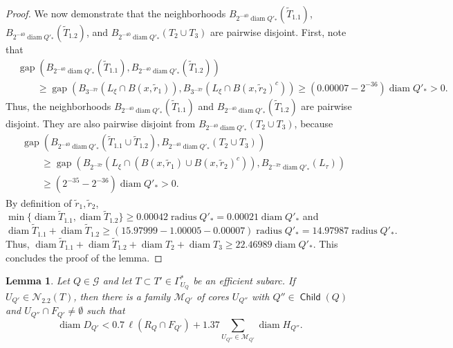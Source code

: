 \documentclass[12pt]{amsart}
\numberwithin{equation}{section}
\theoremstyle{plain}
\newtheorem{lemma}[theorem]{Lemma}
\theoremstyle{definition}
\newcommand{\radius}{\mathop\mathrm{radius}\nolimits}
\newcommand{\diam}{\mathop\mathrm{diam}\nolimits}
\newcommand{\Child}{\mathop\mathsf{Child}\nolimits}
\newcommand{\gap}{\mathop\mathrm{gap}\nolimits}
\numberwithin{figure}{section}
\begin{document}
\begin{proof}
We now demonstrate that the neighborhoods $B_{2^{-40}\diam Q'_*}(\tilde T_{1.1})$, $B_{2^{-40}\diam Q'_*}(\tilde T_{1.2})$, and $B_{2^{-40}\diam Q'_*}(T_2 \cup T_3)$ are pairwise disjoint.  First, note that
\begin{align*}
    &\gap(B_{2^{-40}\diam Q'_*}(\tilde T_{1.1}), B_{2^{-40}\diam Q'_*}(\tilde T_{1.2}))\\
    &\qquad \geq \gap(B_{3^{-37}}(L_{\xi} \cap B(x,\tilde r_1)), B_{3^{-37}}(L_{\xi} \cap B(x,\tilde r_2)^c)) \geq (0.00007 - 2^{-36})\diam Q'_*>0.
\end{align*}
Thus, the neighborhoods $B_{2^{-40}\diam Q'_*}(\tilde T_{1.1})$ and $B_{2^{-40}\diam Q'_*}(\tilde T_{1.2})$ are pairwise disjoint. They are also pairwise disjoint from $B_{2^{-40}\diam Q'_*}(T_2 \cup T_3)$, because 
\begin{align*}
    &\gap(B_{2^{-40}\diam Q'_*}(\tilde T_{1.1} \cup \tilde T_{1.2}), B_{2^{-40}\diam Q'_*}(T_2 \cup T_3))\\
    &\qquad \geq \gap\left(B_{2^{-37}}\left(L_{\xi} \cap \left(B(x,\tilde r_1) \cup B(x,\tilde r_2)^c \right)\right), B_{2^{-37}\diam Q'_*} (L_{\tau})\right)\\
    &\qquad \geq (2^{-35} - 2^{-36})\diam Q'_*>0.
\end{align*}
By definition of $\tilde r_1, \tilde r_2$, $\min\{\diam \tilde T_{1.1},\diam \tilde T_{1.2}\}\geq 0.00042\radius Q'_*=0.00021\diam Q'_*$ and $\diam \tilde T_{1.1}+\diam \tilde T_{1.2} \geq (15.97999-1.00005-0.00007)\radius Q'_*=14.97987\radius Q'_*.$ Thus, $\diam \tilde T_{1.1}+\diam\tilde T_{1.2}+\diam T_2+\diam T_3\geq 22.46989\diam Q'_*$. This concludes the proof of the lemma.
\end{proof}

\begin{lemma}\label{N22-auxiliary} Let $Q\in\mathscr{G}$ and let $T\subset T'\in\Gamma^*_{U_Q}$ be an efficient subarc. If $U_{Q'}\in\mathcal{N}_{2.2}(T)$, then there is a family $\mathcal{M}_{Q'}$ of cores $U_{Q''}$ with $Q''\in\Child(Q)$ and $U_{Q''} \cap F_{Q'} \not= \emptyset$ such that \begin{equation} \label{N22-auxliary-cores-total}
\diam D_{Q'} < 0.7\,\ell(R_Q\cap F_{Q'}) + 1.37 \sum_{U_{Q''}\in\mathcal{M}_{Q'}} \diam H_{Q''}.\end{equation}
\end{lemma}
\end{document}
